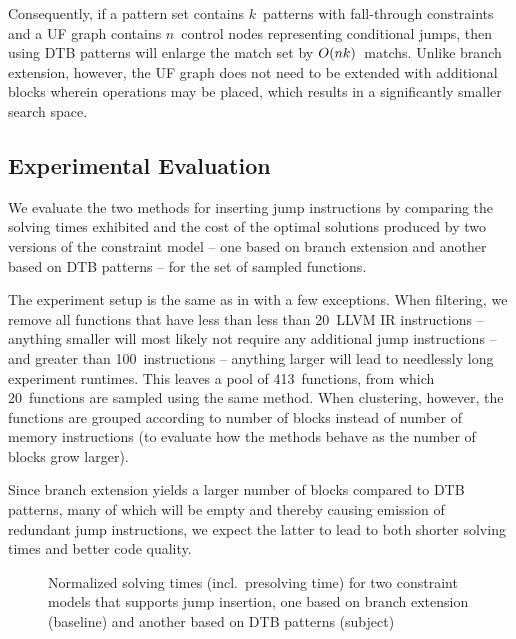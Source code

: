 Consequently, if a \gls{pattern set} contains $k$~\glspl{pattern} with
\gls{fall-through} \glspl{constraint} and a \gls{UF graph} contains
$n$~\glspl{control node} representing conditional jumps, then using \glspl{DTB
  pattern} will enlarge the \gls{match set} by $O(nk)$~\glspl{match}.
%
Unlike \gls{branch extension}, however, the \gls{UF graph} does not need to be
extended with additional \glspl{block} wherein \glspl{operation} may be placed,
which results in a significantly smaller \gls{search space}.


\subsection{Experimental Evaluation}

We evaluate the two methods for inserting jump \glspl{instruction} by comparing
the solving times exhibited and the cost of the optimal \glspl{solution}
produced by two versions of the \gls{constraint model} -- one based on
\gls{branch extension} and another based on \glspl{DTB pattern} -- for the set
of sampled \glspl{function}.

The experiment setup is the same as in
 with a few exceptions.
%
When filtering, we remove all \glspl{function} that have less than less than
\num{20}~\gls{LLVM} \gls{IR} \glspl{instruction} -- anything smaller will most
likely not require any additional jump \glspl{instruction} -- and greater than
\num{100}~\glspl{instruction} -- anything larger will lead to needlessly long
experiment runtimes.
%
This leaves a pool of \num{413}~\glspl{function}, from which
\num{20}~\glspl{function} are sampled using the same method.
%
When clustering, however, the \glspl{function} are grouped according to number
of \glspl{block} instead of number of memory \glspl{instruction} (to evaluate
how the methods behave as the number of blocks grow larger).

Since \gls{branch extension} yields a larger number of \glspl{block} compared to
\glspl{DTB pattern}, many of which will be empty and thereby
causing emission of redundant jump \glspl{instruction}, we expect the latter to
lead to both shorter solving times and better code quality.

\begin{figure}
  \centering%
  \maxsizebox{\textwidth}{!}{%
    \trimBarchartPlot{%
    }%
  }

  \caption[%
            Plot comparing solving times for two constraint models supporting
            jump instruction insertion%
          ]%
          {%
            Normalized solving times (incl.\ presolving time) for two
            constraint models that supports jump insertion, one based on branch
            extension (baseline) and another based on DTB patterns (subject)%
          }
\end{figure}

